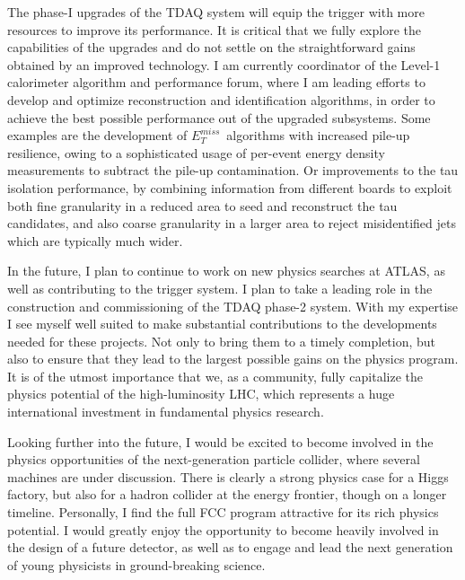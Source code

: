 \documentclass[11pt,a4paper,sans]{moderncv}        %
\newcommand{\met}{\ensuremath{E_{{T}}^{{miss}}}}
\begin{document}
The phase-I upgrades of the TDAQ system will equip the trigger with more resources to improve its performance. It is critical that we fully explore the capabilities of the upgrades and do not settle on the straightforward gains obtained by an improved technology. 
I am currently coordinator of the Level-1 calorimeter algorithm and performance forum, where I am leading efforts to develop and optimize reconstruction and identification algorithms, in order to achieve the best possible performance out of the upgraded subsystems. Some examples are the development of \met\ algorithms with increased pile-up resilience, owing to a sophisticated usage of per-event energy density measurements to subtract the pile-up contamination. Or improvements to the tau isolation performance, by combining information from different boards to exploit both fine granularity in a reduced area to seed and reconstruct the tau candidates, and also coarse granularity in a larger area to reject misidentified jets which are typically much wider.
\newline

In the future, I plan to continue to work on new physics searches at ATLAS, as well as contributing to the trigger system. 
I plan to take a leading role in the construction and commissioning of the TDAQ phase-2 system.
With my expertise I see myself well suited to make substantial contributions to the developments needed for these projects. Not only to bring them to a timely completion, but also to ensure that they lead to the largest possible gains on the physics program. 
It is of the utmost importance that we, as a community, fully 
capitalize the physics potential of the high-luminosity LHC, which represents a huge international 
investment in fundamental physics research.
\newline

Looking further into the future, I would be excited to become involved in the physics opportunities of the next-generation particle collider, where several machines are under discussion. There is clearly a strong physics case for a Higgs factory, but also for a hadron collider at the energy frontier, though on a longer timeline. Personally, I find the full FCC program attractive for its rich physics potential. 
I would greatly enjoy the opportunity to become heavily involved in the design of a future detector, as well as to engage and lead the next generation of young physicists in ground-breaking science.
\newline
\end{document}
